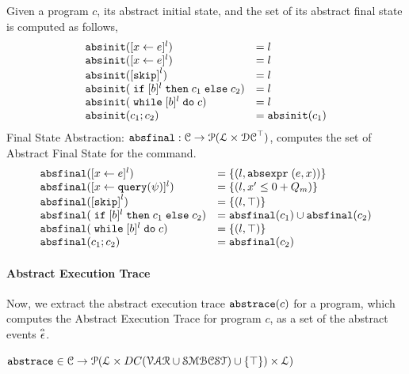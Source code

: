 %
Given a program $c$, its abstract initial state,
and the set of its abstract final state is computed as follows,
%
\[
  \begin{array}{ll}
    \absinit(\clabel{\assign{x}{\expr}}{}^l)  & = l  \\
    \absinit(\clabel{\assign{x}{\expr}}{}^l)  & = l \\
    \absinit(\clabel{\eskip}^{l})  & = l \\
    \absinit(\eif [b]^l \ethen c_1 \eelse c_2)  & = l \\
    \absinit(\ewhile [b]^l \edo c)  & = l \\
    \absinit(c_1 ; c_2)  & = \absinit(c_1) \\
 \end{array}
 \]
%
Final State Abstraction: 
$\mathtt{abs}{\mathtt{final}}: \mathcal{C} \to \mathcal{P}(\mathcal{L} \times \mathcal{DC}^{\top})$,
computes the set of Abstract Final State for the command. 
 \[
  \begin{array}{ll}
    \absfinal(\clabel{\assign{x}{\expr}}{}^l)  & = \{(l, \absexpr\eapp (\expr, x))\}  \\
     \absfinal(\clabel{\assign{x}{\query(\qexpr)}}{}^l)  & = \{
      (l, x' \leq 0 + Q_m )\}  \\
     \absfinal(\clabel{\eskip}^{l})  
     & = \{(l, \top)\} \\
     \absfinal(\eif [b]^l \ethen c_1 \eelse c_2)  & = \absfinal(c_1) \cup \absfinal(c_2) \\
     \absfinal(\ewhile [b]^l \edo c)  & = \{(l, \top)\} \\
     \absfinal(c_1 ; c_2)  & =  \absfinal(c_2) \\
 \end{array}
 \]
 \paragraph{Abstract Execution Trace}
 Now, we  extract the abstract execution trace  $\mathtt{abs}{\mathtt{trace}}(c)$ for a program, which computes the Abstract Execution Trace for program $c$, as a set of the abstract events $\stackrel{\scriptscriptstyle{\alpha}}{\mathtt{\epsilon}{}}$.
 \begin{defn}
 \label{def:abs_trace}
  $\mathtt{abs}{\mathtt{trace}} \in \mathcal{C} \to \mathcal{P}( \mathcal{L} \times DC(\mathcal{VAR}  \cup \mathcal{SMBCST}) \cup \{\top\}) \times \mathcal{L} )$
  \end{defn}

